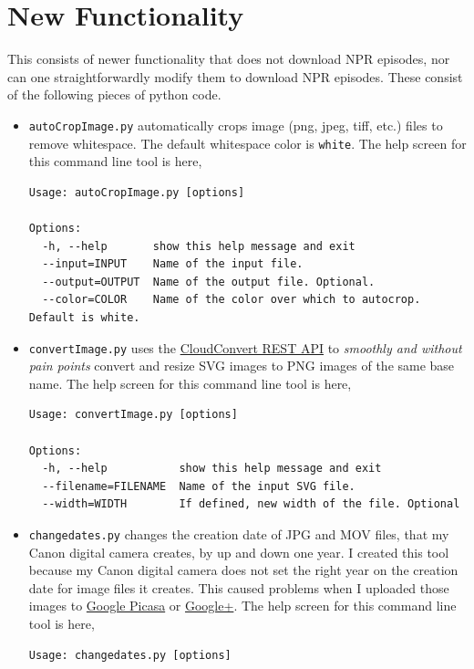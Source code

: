 \documentclass[]{article}
\begin{document}
\section{New Functionality}\label{sec:new_functionality}
This consists of newer functionality that does not download NPR episodes, nor can one straightforwardly modify them to download NPR episodes. These consist of the following pieces of python code.
\begin{itemize}
 \item {\verb|autoCropImage.py|} automatically crops image (png, jpeg, tiff, etc.) files to remove whitespace. The default whitespace color is {\verb|white|}. The help screen for this command line tool is here,
\begin{verbatim}
Usage: autoCropImage.py [options]

Options:
  -h, --help       show this help message and exit
  --input=INPUT    Name of the input file.
  --output=OUTPUT  Name of the output file. Optional.
  --color=COLOR    Name of the color over which to autocrop. Default is white.
\end{verbatim}
 
 \item {\verb|convertImage.py|} uses the \href{https://cloudconvert.com/apiconsole}{CloudConvert REST API} to \textit{smoothly and without pain points} convert and resize SVG images to PNG images of the same base name. The help screen for this command line tool is here,
\begin{verbatim}
Usage: convertImage.py [options]

Options:
  -h, --help           show this help message and exit
  --filename=FILENAME  Name of the input SVG file.
  --width=WIDTH        If defined, new width of the file. Optional
\end{verbatim}
 
 \item {\verb|changedates.py|} changes the creation date of JPG and MOV files, that my Canon digital camera creates, by up and down one year. I created this tool because my Canon digital camera does not set the right year on the creation date for image files it creates. This caused problems when I uploaded those images to \href{https://picasaweb.google.com/home}{Google Picasa} or \href{https://plus.google.com/}{Google+}. The help screen for this command line tool is here,
\begin{verbatim}
Usage: changedates.py [options]


\end{verbatim}
\end{itemize}
\end{document}
